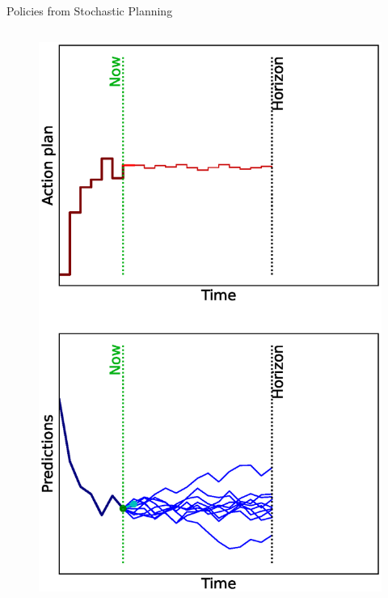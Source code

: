 \documentclass[lecture]{beamer}
\begin{document}
\begin{frame}{\normalsize Policies from Stochastic Planning}
\begin{columns}
\begin{overlayarea}{\textwidth}{0.9\textheight}
\begin{figure}
{          \includegraphics[width=\FS\textwidth,clip]{Codes/MPC/MPCMC6.eps}
        }%
        {%
}
\end{figure}
\end{overlayarea}
\end{columns}
\end{frame}
\end{document}
